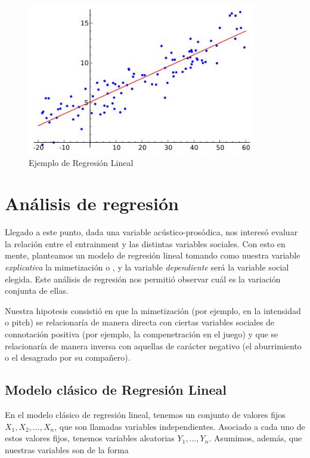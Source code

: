
\begin{figure}[t!]
\centering
\includegraphics[width=10cm]{images/linear_regression.jpg}
\caption{Ejemplo de Regresión Lineal}
\end{figure}

\section{Análisis de regresión}

Llegado a este punto, dada una variable acústico-prosódica, nos interesó evaluar la relación entre el entrainment y las distintas variables sociales. Con esto en mente, planteamos un modelo de regresión lineal tomando como nuestra variable \emph{explicativa} la mimetización o \entrainment, y la variable \emph{dependiente} será la variable social elegida. Este análisis de regresión nos permitió observar cuál es la variación conjunta de ellas.

Nuestra hipotesis consistió en que la mimetización (por ejemplo, en la intensidad o pitch) se relacionaría de manera directa con ciertas variables sociales de connotación positiva (por ejemplo, la compenetración en el juego) y que se relacionaría de manera inversa con aquellas de carácter negativo (el aburrimiento o el desagrado por su compañero).


\subsection{Modelo clásico de Regresión Lineal}

En el modelo clásico de regresión lineal, tenemos un conjunto de valores fijos $X_1, X_2, \ldots, X_n$, que son llamadas variables independientes. Asociado a cada uno de estos valores fijos, tenemos variables aleatorias $Y_1, \ldots, Y_n$. Asumimos, además, que nuestras variables son de la forma

